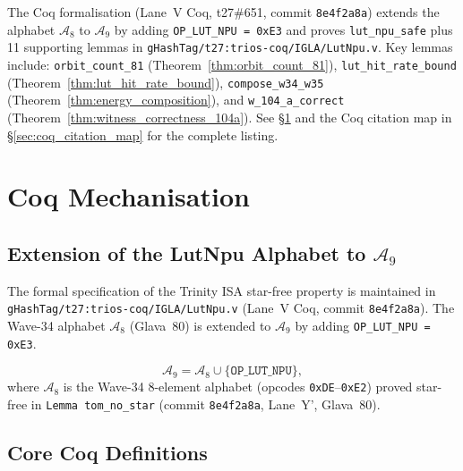 The Coq formalisation (Lane~V Coq, t27\#651, commit \texttt{8e4f2a8a})
extends the alphabet $\mathcal{A}_8$ to $\mathcal{A}_9$ by adding
\texttt{OP\_LUT\_NPU = 0xE3} and proves \texttt{lut\_npu\_safe}
plus 11 supporting lemmas in \texttt{gHashTag/t27:trios-coq/IGLA/LutNpu.v}.
Key lemmas include: \texttt{orbit\_count\_81} (Theorem~\ref{thm:orbit_count_81}),
\texttt{lut\_hit\_rate\_bound} (Theorem~\ref{thm:lut_hit_rate_bound}),
\texttt{compose\_w34\_w35} (Theorem~\ref{thm:energy_composition}), and
\texttt{w\_104\_a\_correct} (Theorem~\ref{thm:witness_correctness_104a}).
See \S\ref{sec:coq_formalization} and the Coq citation map in
\S\ref{sec:coq_citation_map} for the complete listing.

\section{Coq Mechanisation}
\label{sec:coq_formalization}

\subsection{Extension of the LutNpu Alphabet to \(\mathcal{A}_9\)}

The formal specification of the Trinity ISA star-free property is maintained
in \texttt{gHashTag/t27:trios-coq/IGLA/LutNpu.v} (Lane~V Coq,
commit \texttt{8e4f2a8a}).  The Wave-34 alphabet $\mathcal{A}_8$ (Glava~80)
is extended to $\mathcal{A}_9$ by adding \texttt{OP\_LUT\_NPU = 0xE3}.

\begin{definition}
\label{def:alphabet_9}
\[
  \mathcal{A}_9 = \mathcal{A}_8 \cup \bigl\{\mathtt{OP\_LUT\_NPU}\bigr\},
\]
where $\mathcal{A}_8$ is the Wave-34 8-element alphabet (opcodes
\texttt{0xDE}--\texttt{0xE2}) proved star-free in
\texttt{Lemma tom\_no\_star} (commit \texttt{8e4f2a8a},
Lane~Y', Glava~80).
\end{definition}

\subsection{Core Coq Definitions}

